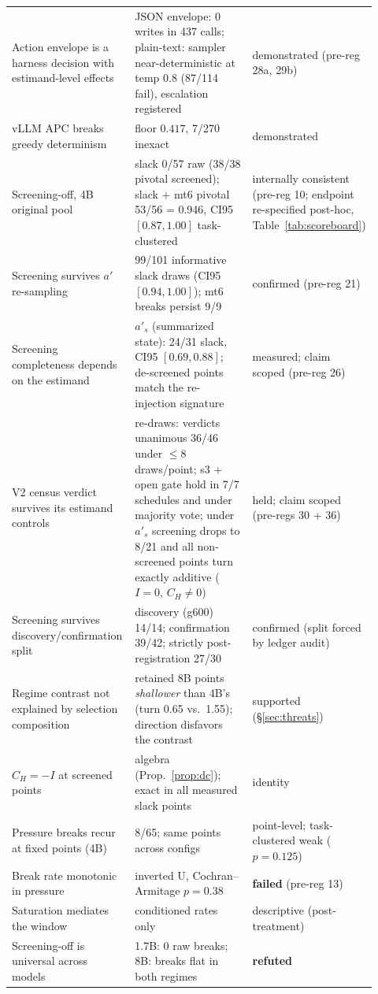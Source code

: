 \documentclass{article}
\theoremstyle{remark}
\begin{document}
\begin{table}[h]
\begin{tabular}{p{0.34\linewidth}p{0.36\linewidth}p{0.22\linewidth}}
Action envelope is a harness decision with estimand-level effects & JSON envelope: 0 writes in 437 calls; plain-text: sampler near-deterministic at temp 0.8 (87/114 fail), escalation registered & demonstrated (pre-reg 28a, 29b) \\
vLLM APC breaks greedy determinism & floor $0.417$, 7/270 inexact & demonstrated \\
Screening-off, 4B original pool & slack 0/57 raw (38/38 pivotal screened); slack + mt6 pivotal 53/56 = 0.946, CI95 $[0.87,1.00]$ task-clustered & internally consistent (pre-reg 10; endpoint re-specified post-hoc, Table~\ref{tab:scoreboard}) \\
Screening survives $a'$ re-sampling & 99/101 informative slack draws (CI95 $[0.94,1.00]$); mt6 breaks persist 9/9 & confirmed (pre-reg 21) \\
Screening completeness depends on the estimand & $a'_s$ (summarized state): 24/31 slack, CI95 $[0.69,0.88]$; de-screened points match the re-injection signature & measured; claim scoped (pre-reg 26) \\
V2 census verdict survives its estimand controls & re-draws: verdicts unanimous 36/46 under $\leq$8 draws/point; s3 + open gate hold in 7/7 schedules and under majority vote; under $a'_s$ screening drops to 8/21 and all non-screened points turn exactly additive ($I=0$, $C_H\neq 0$) & held; claim scoped (pre-regs 30 + 36) \\
Screening survives discovery/confirmation split & discovery (g600) 14/14; confirmation 39/42; strictly post-registration 27/30 & confirmed (split forced by ledger audit) \\
Regime contrast not explained by selection composition & retained 8B points \emph{shallower} than 4B's (turn 0.65 vs.\ 1.55); direction disfavors the contrast & supported (\S\ref{sec:threats}) \\
$C_H = -I$ at screened points & algebra (Prop.~\ref{prop:dc}); exact in all measured slack points & identity \\
Pressure breaks recur at fixed points (4B) & 8/65; same points across configs & point-level; task-clustered weak ($p=0.125$) \\
Break rate monotonic in pressure & inverted U, Cochran--Armitage $p=0.38$ & \textbf{failed} (pre-reg 13) \\
Saturation mediates the window & conditioned rates only & descriptive (post-treatment) \\
Screening-off is universal across models & 1.7B: 0 raw breaks; 8B: breaks flat in both regimes & \textbf{refuted} \\

\end{tabular}
\end{table}
\end{document}
